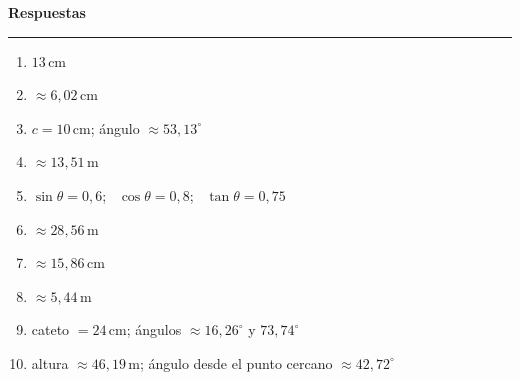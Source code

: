 \documentclass[11pt]{article}
\begin{document}
\newpage
\begin{center}
{\Large \textbf{Respuestas}}\\[2pt]
\rule{6cm}{0.5pt}
\end{center}

\begin{enumerate}[leftmargin=1.2cm, itemsep=0.3cm]
\item $13\,\text{cm}$
\item $\approx 6{,}02\,\text{cm}$
\item $c = 10\,\text{cm}$; ángulo $\approx 53{,}13^\circ$
\item $\approx 13{,}51\,\text{m}$
\item $\sin\theta = 0{,}6$; \ $\cos\theta = 0{,}8$; \ $\tan\theta = 0{,}75$
\item $\approx 28{,}56\,\text{m}$
\item $\approx 15{,}86\,\text{cm}$
\item $\approx 5{,}44\,\text{m}$
\item cateto $= 24\,\text{cm}$; ángulos $\approx 16{,}26^\circ$ y $73{,}74^\circ$
\item altura $\approx 46{,}19\,\text{m}$; ángulo desde el punto cercano $\approx 42{,}72^\circ$
\end{enumerate}
\end{document}
